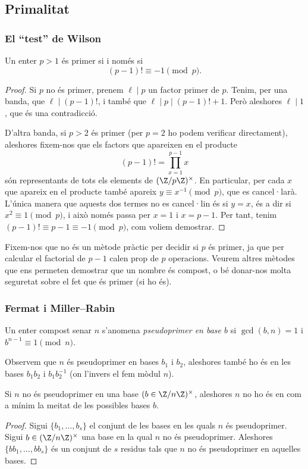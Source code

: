 
\subsection{Primalitat}

\subsubsection{El ``test'' de Wilson}
\begin{proposition}
 Un enter $p>1$ és primer si i només si
 \[
 (p-1)!\equiv -1\pmod{p}.
 \]
\end{proposition}
\begin{proof}
 Si $p$ no és primer, prenem $\ell\mid p$ un factor primer de $p$. Tenim, per una banda, que $\ell\mid (p-1)!$, i també que $\ell\mid p\mid (p-1)!+1$. Però aleshores $\ell\mid 1$, que és una contradicció.
 
 D'altra banda, si $p>2$ és primer (per $p=2$ ho podem verificar directament), aleshores fixem-nos que els factors que apareixen en el producte
 \[
 (p-1)! = \prod_{x=1}^{p-1} x
 \]
 són representants de tots els elements de $(\Z/p\Z)^\times$. En particular, per cada $x$ que apareix en el producte també apareix $y\equiv x^{-1} \pmod p$, que es cancel·larà. L'única manera que aquests dos termes no es cancel·lin és si $y=x$, és a dir si $x^2\equiv 1\pmod p$, i això només passa per $x=1$ i $x=p-1$. Per tant, tenim $(p-1)!\equiv p-1\equiv -1\pmod p$, com voliem demostrar.
\end{proof}
Fixem-nos que no és un mètode pràctic per decidir si $p$ és primer, ja que per calcular el factorial de $p-1$ calen prop de $p$ operacions. Veurem altres mètodes que ens permeten demostrar que un nombre és compost, o bé donar-nos molta seguretat sobre el fet que és primer (si ho és).
 \subsubsection{Fermat i Miller--Rabin}
 
 \begin{definition}
 Un enter compost senar $n$ s'anomena \emph{pseudoprimer en base $b$} si $\gcd(b,n)=1$ i $b^{n-1}\equiv 1\pmod n$.
 \end{definition}
 
 Observem que $n$ és pseudoprimer en bases $b_1$ i $b_2$, aleshores també ho és en les bases $b_1b_2$ i $b_1b_2^{-1}$ (on l'invers el fem mòdul $n$).
 
 \begin{lemma}
 Si $n$ no és pseudoprimer en una base $(b\in\Z/n\Z)^\times$, aleshores $n$ no ho és en com a mínim la meitat de les possibles bases $b$.
 \end{lemma}
 \begin{proof}
  Sigui $\{b_1,\ldots,b_s\}$ el conjunt de les bases en les quals $n$ és pseudoprimer. Sigui $b\in(\Z/n\Z)^\times$ una base en la qual $n$ no és pseudoprimer. Aleshores $\{bb_1,\ldots,bb_s\}$ és un conjunt de $s$ residus tals que $n$ no és pseudoprimer en aquelles bases.
 \end{proof}
 
